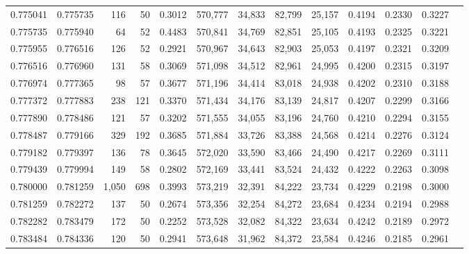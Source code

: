 \begin{tabular}{rrrrrrrrrrrrr}
0.775041 & 0.775735 &   116 &  50 &                                     0.3012 & 570,777 &  34,833 &  82,799 &  25,157 & 0.4194 & 0.2330 & 0.3227 \\
0.775735 & 0.775940 &    64 &  52 &                                     0.4483 & 570,841 &  34,769 &  82,851 &  25,105 & 0.4193 & 0.2325 & 0.3221 \\
0.775955 & 0.776516 &   126 &  52 &                                     0.2921 & 570,967 &  34,643 &  82,903 &  25,053 & 0.4197 & 0.2321 & 0.3209 \\
0.776516 & 0.776960 &   131 &  58 &                                     0.3069 & 571,098 &  34,512 &  82,961 &  24,995 & 0.4200 & 0.2315 & 0.3197 \\
0.776974 & 0.777365 &    98 &  57 &                                     0.3677 & 571,196 &  34,414 &  83,018 &  24,938 & 0.4202 & 0.2310 & 0.3188 \\
0.777372 & 0.777883 &   238 & 121 &                                     0.3370 & 571,434 &  34,176 &  83,139 &  24,817 & 0.4207 & 0.2299 & 0.3166 \\
0.777890 & 0.778486 &   121 &  57 &                                     0.3202 & 571,555 &  34,055 &  83,196 &  24,760 & 0.4210 & 0.2294 & 0.3155 \\
0.778487 & 0.779166 &   329 & 192 &                                     0.3685 & 571,884 &  33,726 &  83,388 &  24,568 & 0.4214 & 0.2276 & 0.3124 \\
0.779182 & 0.779397 &   136 &  78 &                                     0.3645 & 572,020 &  33,590 &  83,466 &  24,490 & 0.4217 & 0.2269 & 0.3111 \\
0.779439 & 0.779994 &   149 &  58 &                                     0.2802 & 572,169 &  33,441 &  83,524 &  24,432 & 0.4222 & 0.2263 & 0.3098 \\
0.780000 & 0.781259 & 1,050 & 698 &                                     0.3993 & 573,219 &  32,391 &  84,222 &  23,734 & 0.4229 & 0.2198 & 0.3000 \\
0.781259 & 0.782272 &   137 &  50 &                                     0.2674 & 573,356 &  32,254 &  84,272 &  23,684 & 0.4234 & 0.2194 & 0.2988 \\
0.782282 & 0.783479 &   172 &  50 &                                     0.2252 & 573,528 &  32,082 &  84,322 &  23,634 & 0.4242 & 0.2189 & 0.2972 \\
0.783484 & 0.784336 &   120 &  50 &                                     0.2941 & 573,648 &  31,962 &  84,372 &  23,584 & 0.4246 & 0.2185 & 0.2961 \\

\end{tabular}
